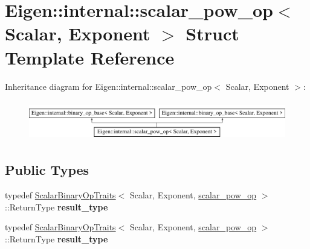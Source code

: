 \hypertarget{struct_eigen_1_1internal_1_1scalar__pow__op}{}\section{Eigen\+:\+:internal\+:\+:scalar\+\_\+pow\+\_\+op$<$ Scalar, Exponent $>$ Struct Template Reference}
\label{struct_eigen_1_1internal_1_1scalar__pow__op}
Inheritance diagram for Eigen\+:\+:internal\+:\+:scalar\+\_\+pow\+\_\+op$<$ Scalar, Exponent $>$\+:\begin{figure}[H]
\begin{center}
\leavevmode
\includegraphics[height=1.755486cm]{struct_eigen_1_1internal_1_1scalar__pow__op}
\end{center}
\end{figure}
\subsection*{Public Types}
\begin{DoxyCompactItemize}
\item 
\mbox{\label{struct_eigen_1_1internal_1_1scalar__pow__op_a00cfb932d02bdffd5a08ef0d98fe8146}} 
typedef \hyperlink{group___core___module_struct_eigen_1_1_scalar_binary_op_traits}{Scalar\+Binary\+Op\+Traits}$<$ Scalar, Exponent, \hyperlink{struct_eigen_1_1internal_1_1scalar__pow__op}{scalar\+\_\+pow\+\_\+op} $>$\+::Return\+Type {\bfseries result\+\_\+type}
\item 
\mbox{\label{struct_eigen_1_1internal_1_1scalar__pow__op_a00cfb932d02bdffd5a08ef0d98fe8146}} 
typedef \hyperlink{group___core___module_struct_eigen_1_1_scalar_binary_op_traits}{Scalar\+Binary\+Op\+Traits}$<$ Scalar, Exponent, \hyperlink{struct_eigen_1_1internal_1_1scalar__pow__op}{scalar\+\_\+pow\+\_\+op} $>$\+::Return\+Type {\bfseries result\+\_\+type}
\end{DoxyCompactItemize}
